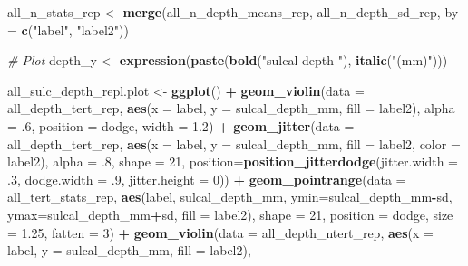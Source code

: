 \documentclass[
]{article}
\newenvironment{Shaded}{\begin{snugshade}}{\end{snugshade}}
\newcommand{\CommentTok}[1]{\textcolor[rgb]{0.56,0.35,0.01}{\textit{#1}}}
\newcommand{\DataTypeTok}[1]{\textcolor[rgb]{0.13,0.29,0.53}{#1}}
\newcommand{\DecValTok}[1]{\textcolor[rgb]{0.00,0.00,0.81}{#1}}
\newcommand{\FloatTok}[1]{\textcolor[rgb]{0.00,0.00,0.81}{#1}}
\newcommand{\KeywordTok}[1]{\textcolor[rgb]{0.13,0.29,0.53}{\textbf{#1}}}
\newcommand{\NormalTok}[1]{#1}
\newcommand{\OperatorTok}[1]{\textcolor[rgb]{0.81,0.36,0.00}{\textbf{#1}}}
\newcommand{\StringTok}[1]{\textcolor[rgb]{0.31,0.60,0.02}{#1}}
\begin{document}
\begin{Shaded}
\begin{Highlighting}[]
\NormalTok{all_n_stats_rep <-}\StringTok{ }\KeywordTok{merge}\NormalTok{(all_n_depth_means_rep, all_n_depth_sd_rep, }\DataTypeTok{by =} \KeywordTok{c}\NormalTok{(}\StringTok{"label"}\NormalTok{, }\StringTok{"label2"}\NormalTok{))}


\CommentTok{# Plot}
\NormalTok{depth_y <-}\StringTok{ }\KeywordTok{expression}\NormalTok{(}\KeywordTok{paste}\NormalTok{(}\KeywordTok{bold}\NormalTok{(}\StringTok{"sulcal depth "}\NormalTok{), }\KeywordTok{italic}\NormalTok{(}\StringTok{"(mm)"}\NormalTok{)))}

\NormalTok{all_sulc_depth_repl.plot <-}\StringTok{ }\KeywordTok{ggplot}\NormalTok{() }\OperatorTok{+}
\StringTok{  }\KeywordTok{geom_violin}\NormalTok{(}\DataTypeTok{data =}\NormalTok{ all_depth_tert_rep, }\KeywordTok{aes}\NormalTok{(}\DataTypeTok{x =}\NormalTok{ label, }\DataTypeTok{y =}\NormalTok{ sulcal_depth_mm, }\DataTypeTok{fill =}\NormalTok{ label2), }
              \DataTypeTok{alpha =} \FloatTok{.6}\NormalTok{, }\DataTypeTok{position =}\NormalTok{ dodge, }\DataTypeTok{width =} \FloatTok{1.2}\NormalTok{) }\OperatorTok{+}\StringTok{ }
\StringTok{  }\KeywordTok{geom_jitter}\NormalTok{(}\DataTypeTok{data =}\NormalTok{ all_depth_tert_rep, }\KeywordTok{aes}\NormalTok{(}\DataTypeTok{x =}\NormalTok{ label, }\DataTypeTok{y =}\NormalTok{ sulcal_depth_mm, }\DataTypeTok{fill =}\NormalTok{ label2, }\DataTypeTok{color =}\NormalTok{ label2), }
              \DataTypeTok{alpha =} \FloatTok{.8}\NormalTok{, }\DataTypeTok{shape =} \DecValTok{21}\NormalTok{,}
              \DataTypeTok{position=}\KeywordTok{position_jitterdodge}\NormalTok{(}\DataTypeTok{jitter.width =} \FloatTok{.3}\NormalTok{, }\DataTypeTok{dodge.width =} \FloatTok{.9}\NormalTok{, }\DataTypeTok{jitter.height =} \DecValTok{0}\NormalTok{)) }\OperatorTok{+}
\StringTok{  }\KeywordTok{geom_pointrange}\NormalTok{(}\DataTypeTok{data =}\NormalTok{ all_tert_stats_rep, }
                  \KeywordTok{aes}\NormalTok{(label, sulcal_depth_mm, }\DataTypeTok{ymin=}\NormalTok{sulcal_depth_mm}\OperatorTok{-}\NormalTok{sd, }\DataTypeTok{ymax=}\NormalTok{sulcal_depth_mm}\OperatorTok{+}\NormalTok{sd, }\DataTypeTok{fill =}\NormalTok{ label2), }
                  \DataTypeTok{shape =} \DecValTok{21}\NormalTok{, }\DataTypeTok{position =}\NormalTok{ dodge, }\DataTypeTok{size =} \FloatTok{1.25}\NormalTok{, }\DataTypeTok{fatten =} \DecValTok{3}\NormalTok{) }\OperatorTok{+}
\StringTok{  }
\StringTok{  }\KeywordTok{geom_violin}\NormalTok{(}\DataTypeTok{data =}\NormalTok{ all_depth_ntert_rep, }\KeywordTok{aes}\NormalTok{(}\DataTypeTok{x =}\NormalTok{ label, }\DataTypeTok{y =}\NormalTok{ sulcal_depth_mm, }\DataTypeTok{fill =}\NormalTok{ label2), }

\end{Highlighting}
\end{Shaded}
\end{document}
